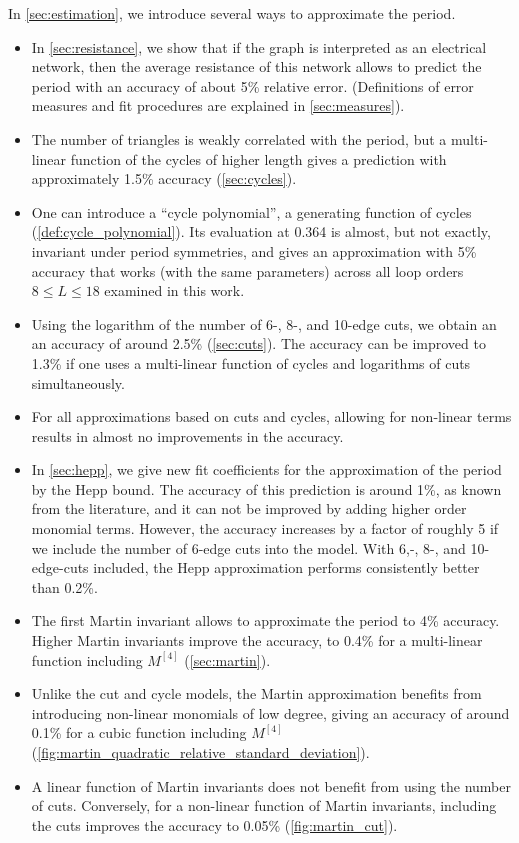 \documentclass[11pt]{scrartcl}
\numberwithin{equation}{section}
\begin{document}
\medskip 
\noindent
In \cref{sec:estimation}, we introduce several ways to approximate the period. 
\begin{itemize}
	\item In \cref{sec:resistance}, we show that if the graph is interpreted as an electrical network, then the average resistance of this network allows to predict the period with an accuracy of about 5\% relative error. (Definitions of error measures and fit procedures are explained in \cref{sec:measures}).
	\item The number of triangles is weakly correlated with the period, but a multi-linear function of the cycles of higher length gives a prediction with approximately 1.5\% accuracy (\cref{sec:cycles}). 
	\item One can introduce a \enquote{cycle polynomial}, a generating function of cycles (\cref{def:cycle_polynomial}). Its evaluation at 0.364 is almost, but not exactly, invariant under period symmetries, and gives an approximation with 5\% accuracy that works (with the same parameters) across all loop orders $8 \leq L \leq 18$ examined in this work. 
	\item Using the logarithm of the number of 6-, 8-, and 10-edge cuts, we obtain an an accuracy of around 2.5\% (\cref{sec:cuts}). The accuracy can be improved to 1.3\% if one uses a multi-linear function of cycles and logarithms of cuts  simultaneously. 
	\item For all approximations based on cuts and cycles,  allowing for non-linear terms results in almost no improvements in the accuracy.
	\item In \cref{sec:hepp}, we give new fit coefficients for the approximation of the period by the Hepp bound. The accuracy of this prediction is around 1\%, as known from the literature, and it can not be improved by adding higher order monomial terms. However, the accuracy increases by a factor of roughly 5 if we include the number of 6-edge cuts into the model. With 6,-, 8-, and 10-edge-cuts included, the Hepp approximation performs consistently better than 0.2\%. 
	\item The first Martin invariant allows to approximate the period to 4\% accuracy. Higher Martin invariants  improve the accuracy, to 0.4\% for a multi-linear function including $M^{[4]}$ (\cref{sec:martin}). 
	\item Unlike the cut and cycle models, the Martin approximation benefits from introducing non-linear monomials of low degree, giving an accuracy of around  0.1\% for a cubic function including $M^{[4]}$ (\cref{fig:martin_quadratic_relative_standard_deviation}). 
	\item A  linear function of Martin invariants does not benefit from using the number of cuts. Conversely, for a non-linear function of Martin invariants, including the cuts  improves the accuracy to 0.05\% (\cref{fig:martin_cut}). 
\end{itemize}
\end{document}
